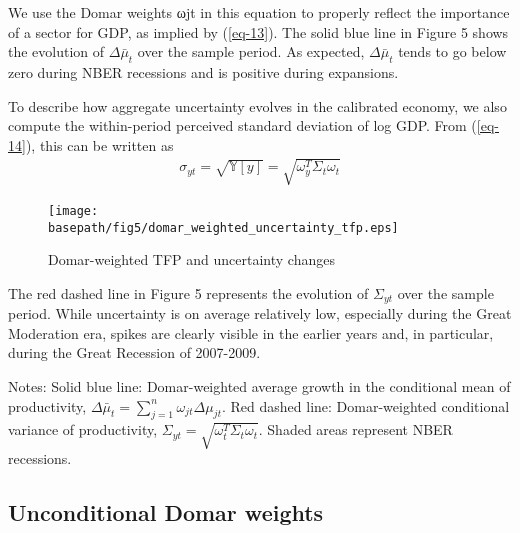 \documentclass[11pt]{article}
\theoremstyle{definition}
\newcommand{\basepath}{F:/12004835/replication_package_final/replication_package_final/output_figures}
\begin{document}
	We use the Domar weights ωjt in this equation to properly reflect the importance of a sector for GDP, as implied by (\ref{eq-13}). The solid blue line in Figure 5 shows the evolution of $\Delta\bar{\mu}_t$ over the sample period. As expected, $\Delta\bar{\mu}_t$ tends to go below zero during NBER recessions and is positive during expansions.
	
	To describe how aggregate uncertainty evolves in the calibrated economy, we also compute the within-period perceived standard deviation of log GDP. From (\ref{eq-14}), this can be written as
	\begin{align}
		\sigma_{yt} = \sqrt{\mathbb{Y}[y]} = \sqrt{\omega_y^T \Sigma_t \omega_t} \label{eq-71}
	\end{align}
	
	\begin{figure}[ht]
		\caption{Domar-weighted TFP and uncertainty changes}
		\texttt{[image: \\basepath/fig5/domar\_weighted\_uncertainty\_tfp.eps]}
		\label{fig:5}
	\end{figure}
	
	The red dashed line in Figure 5 represents the evolution of $\Sigma_{yt}$ over the sample period. While uncertainty is on average relatively low, especially during the Great Moderation era, spikes are clearly visible in the earlier years and, in particular, during the Great Recession of 2007-2009.
	
	Notes: Solid blue line: Domar-weighted average growth in the conditional mean of productivity, $\Delta\bar{\mu}_t = \sum\limits_{j=1}^n \omega_{jt}\Delta\mu_{jt}$. Red dashed line: Domar-weighted conditional variance of productivity, $\Sigma_{yt} = \sqrt{\omega_t^T \Sigma_t \omega_t}$. Shaded areas represent NBER recessions.
	
	\subsection*{Unconditional Domar weights}
	
	
	
	
	
	
	
	
	
	
	
	
\end{document}
